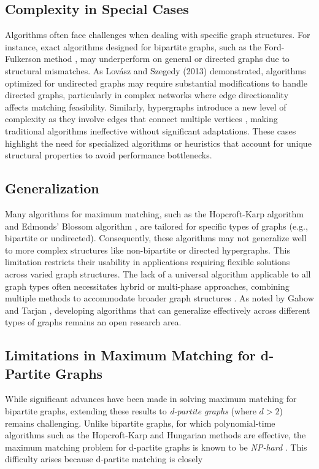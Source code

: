 \subsection{Complexity in Special Cases}
Algorithms often face challenges when dealing with specific graph structures. For instance, exact algorithms designed for bipartite graphs, such as the Ford-Fulkerson method \cite{ford1956flows}, may underperform on general or directed graphs due to structural mismatches. As Lovász and Szegedy (2013) \cite{lovasz2013randomized} demonstrated, algorithms optimized for undirected graphs may require substantial modifications to handle directed graphs, particularly in complex networks where edge directionality affects matching feasibility. Similarly, hypergraphs introduce a new level of complexity as they involve edges that connect multiple vertices \cite{Berge1989Hypergraphs}, making traditional algorithms ineffective without significant adaptations. These cases highlight the need for specialized algorithms or heuristics that account for unique structural properties to avoid performance bottlenecks.

\subsection{Generalization}
Many algorithms for maximum matching, such as the Hopcroft-Karp algorithm \cite{karzanov1973maximum} and Edmonds' Blossom algorithm \cite{edmonds1965paths}, are tailored for specific types of graphs (e.g., bipartite or undirected). Consequently, these algorithms may not generalize well to more complex structures like non-bipartite or directed hypergraphs. This limitation restricts their usability in applications requiring flexible solutions across varied graph structures. The lack of a universal algorithm applicable to all graph types often necessitates hybrid or multi-phase approaches, combining multiple methods to accommodate broader graph structures \cite{avis1983greedy}. As noted by Gabow and Tarjan \cite{gabow1991faster}, developing algorithms that can generalize effectively across different types of graphs remains an open research area.

\subsection{Limitations in Maximum Matching for d-Partite Graphs}
While significant advances have been made in solving maximum matching for bipartite graphs, extending these results to \textit{d-partite graphs} (where \(d > 2\)) remains challenging. Unlike bipartite graphs, for which polynomial-time algorithms such as the Hopcroft-Karp \cite{hopcroft1973n} and Hungarian methods \cite{kuhn1955hungarian} are effective, the maximum matching problem for d-partite graphs is known to be \textit{NP-hard} \cite{karp1972reducibility}. This difficulty arises because d-partite matching is closely
